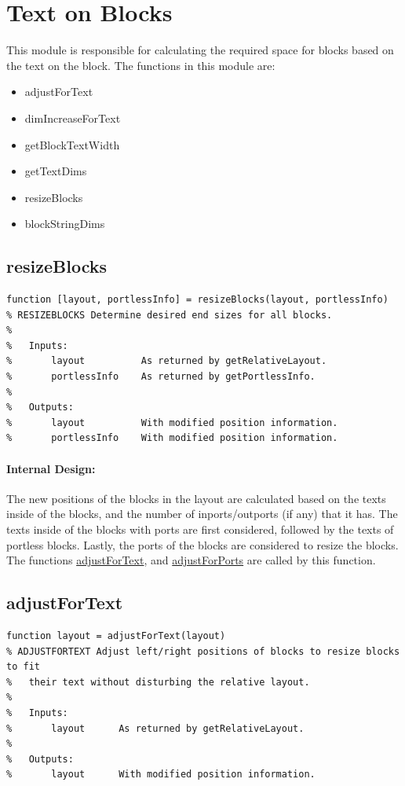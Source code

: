 \documentclass[12pt,letterpaper]{report}
\begin{document}
\section{Text on Blocks}
\par This module is responsible for calculating the required space for blocks based on the text on the block. The functions in this module are:
\begin{itemize}
	\item adjustForText
	\item dimIncreaseForText
	\item getBlockTextWidth
	\item getTextDims
	\item resizeBlocks
	\item blockStringDims
\end{itemize}

\subsection{resizeBlocks}
\begin{lstlisting}
function [layout, portlessInfo] = resizeBlocks(layout, portlessInfo)
% RESIZEBLOCKS Determine desired end sizes for all blocks.
%
%   Inputs:
%       layout          As returned by getRelativeLayout.
%       portlessInfo    As returned by getPortlessInfo.
%
%   Outputs:
%       layout          With modified position information.
%       portlessInfo    With modified position information.
\end{lstlisting}
\paragraph{Internal Design:} The new positions of the blocks in the layout are calculated based on the texts inside of the blocks, and the number of inports/outports (if any) that it has. The texts inside of the blocks with ports are first considered, followed by the texts of portless blocks. Lastly, the ports of the blocks are considered to resize the blocks. The functions \hyperref[adjustForText]{adjustForText}, and \hyperref[adjustForPorts]{adjustForPorts} are called by this function.

\subsection{adjustForText} \label{adjustForText}
\begin{lstlisting}
function layout = adjustForText(layout)
% ADJUSTFORTEXT Adjust left/right positions of blocks to resize blocks to fit
%   their text without disturbing the relative layout.
%
%   Inputs:
%       layout      As returned by getRelativeLayout.
%
%   Outputs:
%       layout      With modified position information.
\end{lstlisting}
\end{document}
